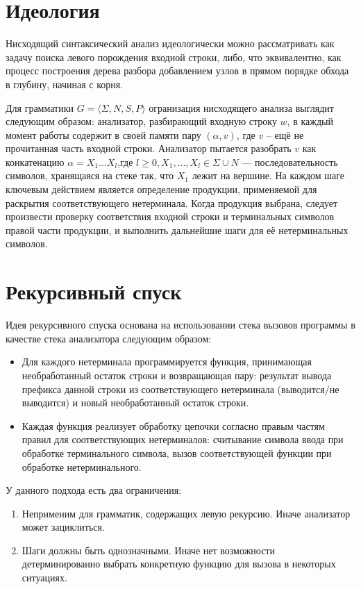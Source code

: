 \documentclass[10pt]{article}         %
\begin{document}
	\section{Идеология}
	Нисходящий синтаксический анализ идеологически можно рассматривать как задачу поиска левого порождения входной строки, либо, что эквивалентно, как процесс построения дерева разбора добавлением узлов в прямом порядке обхода в глубину, начиная с корня. 

	
	
	Для грамматики $G = \langle \Sigma, N, S, P \rangle$ огранизация нисходящего анализа выглядит следующим образом: анализатор, разбирающий входную строку $w$, в каждый момент работы содержит в своей памяти пару $(\alpha, v)$, где $v$ -- ещё не прочитанная часть входной строки. Анализатор пытается разобрать $v$ как конкатенацию $\alpha=X_1\dots{X_l}$,где $l \geq{0}, X_1,\dots{,X_l} \in \Sigma\cup{N}$ --- последовательность символов, хранящаяся на стеке так, что $X_1$ лежит на вершине. На каждом шаге ключевым действием является определение продукции, применяемой для раскрытия соответствующего нетерминала. Когда продукция выбрана, следует произвести проверку соответствия  входной строки и терминальных символов правой части продукции, и выполнить дальнейшие шаги для её нетерминальных символов.
	\section{Рекурсивный спуск}
	
	Идея рекурсивного спуска основана на использовании стека вызовов программы в качестве стека анализатора следующим образом:
	
	\begin{itemize}
		\item Для каждого нетерминала программируется функция, принимающая необработанный остаток строки и возвращающая пару: результат вывода префикса данной строки из соответствующего нетерминала (выводится/не выводится) и новый необработанный остаток строки.
		\item Каждая функция реализует обработку цепочки согласно правым частям правил для соответствующих нетерминалов: считывание символа ввода при обработке терминального символа, вызов соответствующей функции при обработке нетерминального.
	\end{itemize}
	
	У данного подхода есть два ограничения:
	\begin{enumerate}
		\item Неприменим для грамматик, содержащих левую рекурсию. Иначе анализатор может зациклиться.
		\item Шаги должны быть однозначными. Иначе нет возможности детерминированно выбрать конкретную функцию для вызова в некоторых ситуациях.
	\end{enumerate}
	
\end{document}
